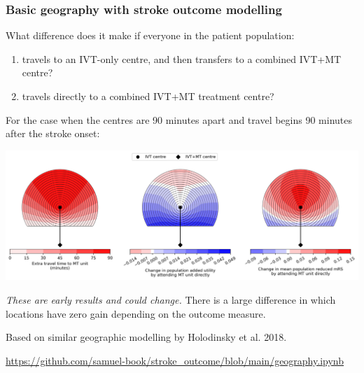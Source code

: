 \documentclass[xcolor={usenames,dvipsnames}]{beamer}
\newcommand{\smallurl}[1]{\textcolor{blue}{\fontsize{4pt}{4.8pt}\selectfont \url{#1}}}
\begin{document}
\begin{frame}[noframenumbering]
\frametitle{Basic geography with stroke outcome modelling}

\footnotesize{What difference does it make if everyone in the patient population:}
\begin{enumerate}
    \footnotesize
    \item travels to an IVT-only centre, and then transfers to a combined IVT+MT centre? 
    \item travels directly to a combined IVT+MT treatment centre? 
\end{enumerate} 

\footnotesize{For the case when the centres are 90 minutes apart and travel begins 90 minutes after the stroke onset:}

\begin{center}
\includegraphics[width=\textwidth]{./images/circle_plots_t-IVT-to-MT=90_t-onset-to-ambo=90}
\end{center} 




\footnotesize{\emph{These are early results and could change.} There is a large difference in which locations have zero gain depending on the outcome measure.}

\vspace{0.5em}
\tiny{Based on similar geographic modelling by Holodinsky et al. 2018.}

\smallurl{https://github.com/samuel-book/stroke_outcome/blob/main/geography.ipynb}

\end{frame}


\end{document}
